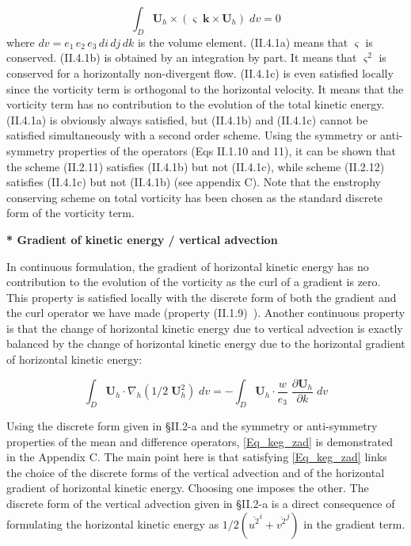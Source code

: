 \documentclass[NEMO_book]{subfiles}
\begin{document}
\begin{equation} \label{Eq_vor_energy}
\int_D {{\textbf{U}}_h \times \left( {\varsigma \;{\textbf{k}}\times {\textbf{U}}_h } \right)\;dv} =0
\end{equation}
where $dv = e_1\, e_2\, e_3\, di\, dj\, dk$ is the volume element. 
(II.4.1a) means that $\varsigma $ is conserved. (II.4.1b) is obtained by an 
integration by part. It means that $\varsigma^2$ is conserved for a horizontally 
non-divergent flow. 
(II.4.1c) is even satisfied locally since the vorticity term is orthogonal 
to the horizontal velocity. It means that the vorticity term has no 
contribution to the evolution of the total kinetic energy. (II.4.1a) is 
obviously always satisfied, but (II.4.1b) and (II.4.1c) cannot be satisfied 
simultaneously with a second order scheme. Using the symmetry or 
anti-symmetry properties of the operators (Eqs II.1.10 and 11), it can be 
shown that the scheme (II.2.11) satisfies (II.4.1b) but not (II.4.1c), while 
scheme (II.2.12) satisfies (II.4.1c) but not (II.4.1b) (see appendix C). 
Note that the enstrophy conserving scheme on total vorticity has been chosen 
as the standard discrete form of the vorticity term.

\textbf{* Gradient of kinetic energy / vertical advection}

In continuous formulation, the gradient of horizontal kinetic energy has no 
contribution to the evolution of the vorticity as the curl of a gradient is 
zero. This property is satisfied locally with the discrete form of both the 
gradient and the curl operator we have made (property (II.1.9)~). Another 
continuous property is that the change of horizontal kinetic energy due to 
vertical advection is exactly balanced by the change of horizontal kinetic 
energy due to the horizontal gradient of horizontal kinetic energy:

\begin{equation} \label{Eq_keg_zad}
\int_D {{\textbf{U}}_h \cdot \nabla _h \left( {1/2\;{\textbf{U}}_h ^2} \right)\;dv} =-\int_D {{\textbf{U}}_h \cdot \frac{w}{e_3 }\;\frac{\partial 
{\textbf{U}}_h }{\partial k}\;dv}
\end{equation}

Using the discrete form given in {\S}II.2-a and the symmetry or 
anti-symmetry properties of the mean and difference operators, \eqref{Eq_keg_zad} is 
demonstrated in the Appendix C. The main point here is that satisfying 
\eqref{Eq_keg_zad} links the choice of the discrete forms of the vertical advection 
and of the horizontal gradient of horizontal kinetic energy. Choosing one 
imposes the other. The discrete form of the vertical advection given in 
{\S}II.2-a is a direct consequence of formulating the horizontal kinetic 
energy as $1/2 \left( \overline{u^2}^i + \overline{v^2}^j \right) $ in the gradient term.
\end{document}
